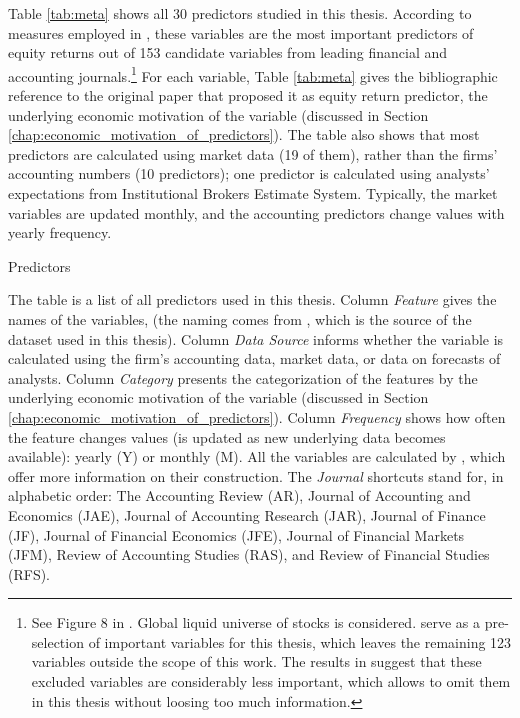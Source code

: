 		Table \ref{tab:meta} shows all 30 predictors studied in this thesis. According to measures employed in \cite{tobek2020does}, these variables are the most important predictors of equity returns out of 153 candidate variables from leading financial and accounting journals.\footnote{See Figure 8 in \cite{tobek2020does}. Global liquid universe of stocks is considered. \cite{tobek2020does} serve as a pre-selection of important variables for this thesis, which leaves the remaining 123 variables outside the scope of this work. The results in \cite{tobek2020does} suggest that these excluded variables are considerably less important, which allows to omit them in this thesis without loosing too much information.} For each variable, Table \ref{tab:meta} gives the bibliographic reference to the original paper that proposed it as equity return predictor, the underlying economic motivation of the variable (discussed in Section \ref{chap:economic_motivation_of_predictors}). The table also shows that most predictors are calculated using market data (19 of them), rather than the firms' accounting numbers (10 predictors); one predictor is calculated using analysts' expectations from Institutional Brokers Estimate System. Typically, the market variables are updated monthly, and the accounting predictors change values with yearly frequency.
		
		\begin{table}
			\resizebox{\textwidth}{!}{}
			\caption{Predictors}
			\label{tab:meta}
			\medskip
			\small
			The table is a list of all predictors used in this thesis. Column \textit{Feature} gives the names of the variables, (the naming comes from \cite{tobek2020does}, which is the source of the dataset used in this thesis).  
			Column \textit{Data Source} informs whether the variable is calculated using the firm's accounting data, market data, or data on forecasts of analysts. Column \textit{Category} presents the categorization of the features by the underlying economic motivation of the variable (discussed in Section \ref{chap:economic_motivation_of_predictors}). Column \textit{Frequency} shows how often the feature changes values (is updated as new underlying data becomes available): yearly (Y) or monthly (M). All the variables are calculated by \cite{tobek2020does}, which offer more information on their construction. The \textit{Journal} shortcuts stand for, in alphabetic order: The Accounting Review (AR), Journal of Accounting and Economics (JAE), Journal of Accounting Research (JAR), Journal of Finance (JF), Journal of Financial Economics (JFE), Journal of Financial Markets (JFM), Review of Accounting Studies (RAS), and Review of Financial Studies (RFS). 
		\end{table}
	
